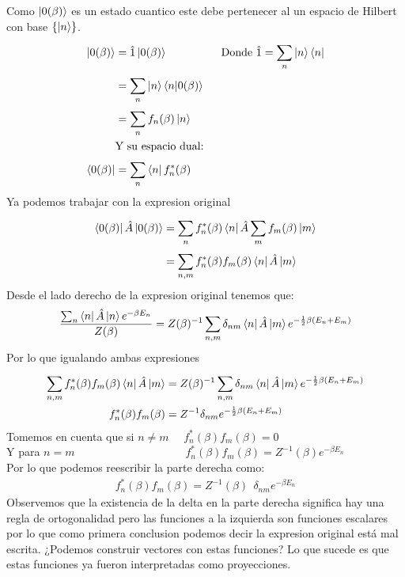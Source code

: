 \documentclass{article}
\begin{document}
Como $ \ket{0(\beta)} $ es un estado cuantico este debe pertenecer al un espacio de Hilbert con base $ \{\ket{n }\} $. 
\begin{align*}
  \ket{0(\beta)} &= \hat 1 \ket{0(\beta)} \qquad \qquad &\text{Donde }\hat 1 = \displaystyle\sum_{n }^{} \ket{n }\bra{n }\\
  &= \displaystyle\sum_{n }^{} \ket{n }\bra{n }\ket{0(\beta)}&\\
  &= \displaystyle\sum_{n }^{} f_n (\beta) \ket{n }& \\
  & \text{Y su espacio dual: }\\
  \bra{0(\beta)} &= \displaystyle\sum_{n }^{} \bra{n }f_n^*(\beta) &
\end{align*}
Ya podemos trabajar con la expresion original
\begin{align*}
  \bra{0(\beta)}\hat A \ket{0(\beta)} &= \displaystyle\sum_{n }^{} f_n^*(\beta) \bra{n }\hat A \displaystyle\sum_{m }^{}f_m (\beta) \ket{m } \\
  &= \displaystyle\sum_{n,m }^{} f_n^*(\beta) f_m (\beta) \bra{n }\hat A \ket{m } 
\end{align*}
Desde el lado derecho de la expresion original tenemos que: 
\begin{align*}
   \frac{\sum_{n }^{} \bra{n }\hat A \ket{n } e ^ {-\beta E_n }   }{Z (\beta )} =Z(\beta) ^ {-1} \sum_{n,m  }^{} \delta _{nm } \bra{n }\hat A \ket{m } e ^ {-\frac{1}{2}\beta (E_n+E_m) }
\end{align*}
Por lo que igualando ambas expresiones 
\begin{align*}
  \displaystyle\sum_{n,m }^{} f_n^*(\beta) f_m (\beta) \bra{n }\hat A \ket{m } &=  Z(\beta) ^ {-1} \sum_{n,m  }^{} \delta _{nm } \bra{n }\hat A \ket{m } e ^ {-\frac{1}{2}\beta (E_n+E_m) }\\
  f_n^*(\beta ) f_m(\beta) &= Z ^ {-1 } \delta _{nm } e ^ {- \frac{1}{2} \beta (E_n +E_m )}
\end{align*}
Tomemos en cuenta que si $ n \neq m  $ $ \quad f_n^* (\beta) f_m (\beta) = 0  $\\
Y para $ n = m  $ $ \qquad\qquad\qquad\qquad\quad \text{ }  f_n^* (\beta) f_m (\beta) = Z ^ {-1 }(\beta) e ^ {-\beta E_n }$\\
Por lo que podemos reescribir la parte derecha como: 
\begin{gather*}
  f_n^*(\beta) f_m(\beta)= Z ^ {-1 }(\beta)\ \ \delta _{nm} e ^ {-\beta E_n } 
\end{gather*}
Observemos que la existencia de la delta en la parte derecha significa hay una regla de ortogonalidad pero las funciones a la izquierda son funciones escalares por lo que como primera conclusion podemos decir la expresion original está mal escrita. ¿Podemos construir vectores con estas funciones? Lo que sucede es que estas funciones ya fueron interpretadas como proyecciones.
\end{document}
